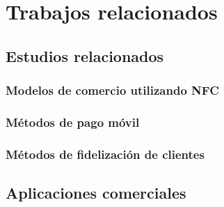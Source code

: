 \section{Trabajos relacionados}
  \subsection{Estudios relacionados}
    \subsubsection{Modelos de comercio utilizando NFC}
    \subsubsection{Métodos de pago móvil}
    \subsubsection{Métodos de fidelización de clientes}

  \subsection{Aplicaciones comerciales}
